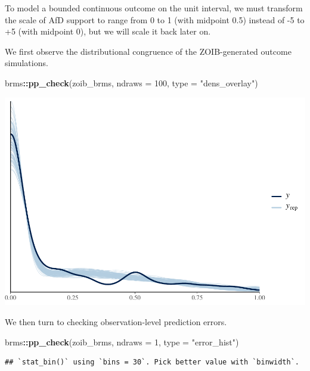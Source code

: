 \documentclass[
  11pt,
]{article}
\newenvironment{Shaded}{\begin{snugshade}}{\end{snugshade}}
\newcommand{\AttributeTok}[1]{\textcolor[rgb]{0.13,0.29,0.53}{#1}}
\newcommand{\DecValTok}[1]{\textcolor[rgb]{0.00,0.00,0.81}{#1}}
\newcommand{\FunctionTok}[1]{\textcolor[rgb]{0.13,0.29,0.53}{\textbf{#1}}}
\newcommand{\NormalTok}[1]{#1}
\newcommand{\SpecialCharTok}[1]{\textcolor[rgb]{0.81,0.36,0.00}{\textbf{#1}}}
\newcommand{\StringTok}[1]{\textcolor[rgb]{0.31,0.60,0.02}{#1}}
\begin{document}
To model a bounded continuous outcome on the unit interval, we must transform the scale of AfD support to range
from 0 to 1 (with midpoint 0.5) instead of -5 to +5 (with midpoint 0), but we will scale it back later on.

We first observe the distributional congruence of the ZOIB-generated outcome
simulations.

\begin{Shaded}
\begin{Highlighting}[]
\NormalTok{brms}\SpecialCharTok{::}\FunctionTok{pp\_check}\NormalTok{(zoib\_brms, }\AttributeTok{ndraws =} \DecValTok{100}\NormalTok{, }\AttributeTok{type =} \StringTok{"dens\_overlay"}\NormalTok{)}
\end{Highlighting}
\end{Shaded}

\begin{center}\includegraphics{02-02-lec_files/figure-latex/brms-zoib-pp-1-1} \end{center}

We then turn to checking observation-level prediction errors.

\begin{Shaded}
\begin{Highlighting}[]
\NormalTok{brms}\SpecialCharTok{::}\FunctionTok{pp\_check}\NormalTok{(zoib\_brms, }\AttributeTok{ndraws =} \DecValTok{1}\NormalTok{, }\AttributeTok{type =} \StringTok{"error\_hist"}\NormalTok{)}
\end{Highlighting}
\end{Shaded}

\begin{verbatim}
## `stat_bin()` using `bins = 30`. Pick better value with `binwidth`.
\end{verbatim}
\end{document}
